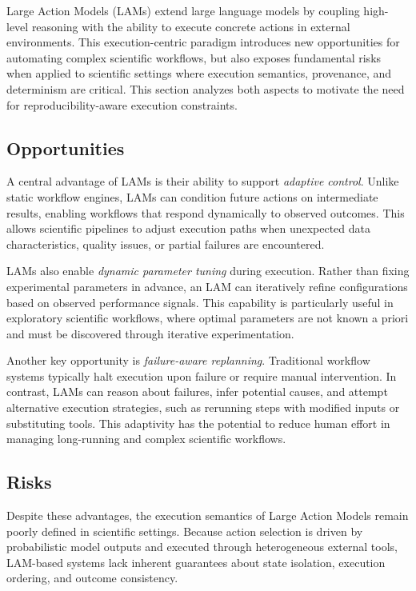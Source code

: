 \documentclass[conference]{IEEEtran}
\begin{document}
Large Action Models (LAMs) extend large language models by coupling high-level reasoning with the ability to execute concrete actions in external environments. This execution-centric paradigm introduces new opportunities for automating complex scientific workflows, but also exposes fundamental risks when applied to scientific settings where execution semantics, provenance, and determinism are critical. This section analyzes both aspects to motivate the need for reproducibility-aware execution constraints.

\subsection{Opportunities}

A central advantage of LAMs is their ability to support \emph{adaptive control}. Unlike static workflow engines, LAMs can condition future actions on intermediate results, enabling workflows that respond dynamically to observed outcomes. This allows scientific pipelines to adjust execution paths when unexpected data characteristics, quality issues, or partial failures are encountered.

LAMs also enable \emph{dynamic parameter tuning} during execution. Rather than fixing experimental parameters in advance, an LAM can iteratively refine configurations based on observed performance signals. This capability is particularly useful in exploratory scientific workflows, where optimal parameters are not known a priori and must be discovered through iterative experimentation.

Another key opportunity is \emph{failure-aware replanning}. Traditional workflow systems typically halt execution upon failure or require manual intervention. In contrast, LAMs can reason about failures, infer potential causes, and attempt alternative execution strategies, such as rerunning steps with modified inputs or substituting tools. This adaptivity has the potential to reduce human effort in managing long-running and complex scientific workflows.

\subsection{Risks}

Despite these advantages, the execution semantics of Large Action Models remain poorly defined in scientific settings. Because action selection is driven by probabilistic model outputs and executed through heterogeneous external tools, LAM-based systems lack inherent guarantees about state isolation, execution ordering, and outcome consistency.
\end{document}
